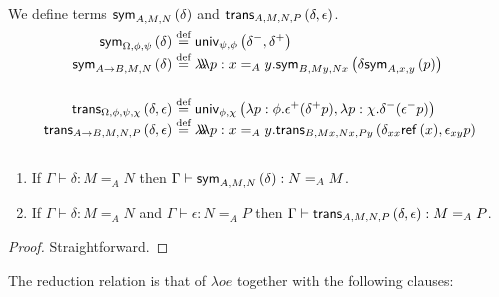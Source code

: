 We define terms $\mathsf{sym}_{{A},{M},{N}} \left( {\delta} \right)$ and $\mathsf{trans}_{{A},{M},{N},{P}} \left( {\delta} , {\epsilon} \right)$.
\begin{align*}
\sym{\Omega}{\phi}{\psi}{\delta} & \eqdef \univ{\psi}{\phi}{\delta^-}{\delta^+} \\
\sym{A \rightarrow B}{M}{N}{\delta} & \eqdef \triplelambda p:x =_A y. \sym{B}{My}{Nx}{\delta
\sym{A}{x}{y}{p}} \\
& \\
\trans{\Omega}{\phi}{\psi}{\chi}{\delta}{\epsilon} & \eqdef \univ{\phi}{\chi}
{\lambda p:\phi.\epsilon^+(\delta^+ p)}{\lambda p:\chi.\delta^-(\epsilon^- p)} \\
\trans{A \rightarrow B}{M}{N}{P}{\delta}{\epsilon}
& \eqdef \triplelambda p:x =_A y. \trans{B}{Mx}{Nx}{Py}{\delta_{xx} \reff{x}}{\epsilon_{xy} p}
\end{align*}

\begin{lm}
$ $
\begin{enumerate}
\item
If $\Gamma \vdash \delta : M =_A N$ then $\Gamma \vdash \mathsf{sym}_{{A},{M},{N}} \left( {\delta} \right) : N =_A M$.
\item
If $\Gamma \vdash \delta : M =_A N$ and $\Gamma \vdash \epsilon : N =_A P$ then
$\Gamma \vdash \mathsf{trans}_{{A},{M},{N},{P}} \left( {\delta} , {\epsilon} \right) : M =_A P$.
\end{enumerate}
\end{lm}

\begin{proof}
Straightforward.
\end{proof}

The reduction relation is that of $\lambda o e$ together with the following clauses:


